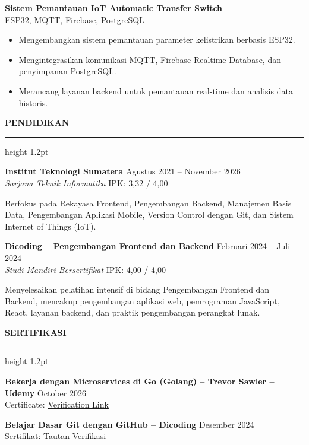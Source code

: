 \documentclass[11pt,a4paper]{article}
\newcommand{\secfontsize}{14}
\newcommand{\seclineheight}{1.2pt}
\newcommand{\secgapabove}{14pt}
\newcommand{\secgaptitle}{6pt}
\newcommand{\secgapbelow}{10pt}
\newcommand{\cvsection}[1]{%
    \par\vspace{\secgapabove}%
    {\fontsize{\secfontsize}{\numexpr\secfontsize+3\relax}\selectfont\bfseries\scshape #1}\par
    \vspace{\secgaptitle}%
    {\color{black}\hrule height \seclineheight}%
    \vspace{\secgapbelow}%
    \noindent\ignorespaces
}
\newcommand{\techstack}[1]{{\small\color{muted}#1}}
\begin{document}
\vspace{4pt}

\textbf{Sistem Pemantauan IoT Automatic Transfer Switch}\\[2pt]
\techstack{ESP32, MQTT, Firebase, PostgreSQL}
\begin{itemize}
\item Mengembangkan sistem pemantauan parameter kelistrikan berbasis ESP32.
\item Mengintegrasikan komunikasi MQTT, Firebase Realtime Database, dan penyimpanan PostgreSQL.
\item Merancang layanan backend untuk pemantauan real-time dan analisis data historis.
\end{itemize}

\cvsection{PENDIDIKAN}
\textbf{Institut Teknologi Sumatera}
\hfill
Agustus 2021 -- November 2026 \\
\textit{Sarjana Teknik Informatika} \hfill IPK: 3,32 / 4,00

Berfokus pada Rekayasa Frontend, Pengembangan Backend, Manajemen Basis Data, Pengembangan Aplikasi Mobile, Version Control dengan Git, dan Sistem Internet of Things (IoT).

\vspace{6pt}

\textbf{Dicoding -- Pengembangan Frontend dan Backend}
\hfill
Februari 2024 -- Juli 2024 \\
\textit{Studi Mandiri Bersertifikat} \hfill IPK: 4,00 / 4,00

Menyelesaikan pelatihan intensif di bidang Pengembangan Frontend dan Backend, mencakup pengembangan aplikasi web, pemrograman JavaScript, React, layanan backend, dan praktik pengembangan perangkat lunak.


\cvsection{SERTIFIKASI}
\textbf{Bekerja dengan Microservices di Go (Golang) -- Trevor Sawler -- Udemy}
\hfill October 2026 \\
Certificate: \href{https://www.udemy.com/certificate/UC-35a6feca-5e9a-489b-abd2-3a4fb11bfc29/}{Verification Link}

\vspace{5pt}

\textbf{Belajar Dasar Git dengan GitHub -- Dicoding}
\hfill Desember 2024 \\
Sertifikat: \href{https://www.dicoding.com/certificates/6RPNV0G88Z2M}{Tautan Verifikasi}

\vspace{5pt}
\end{document}
